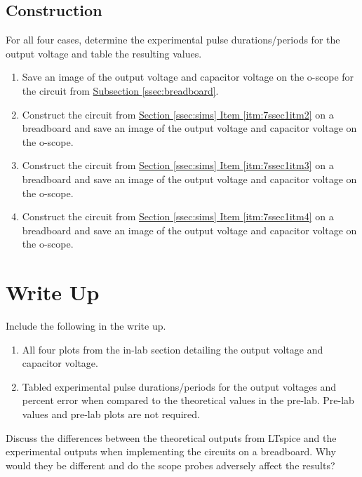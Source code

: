\subsection{Construction}

For all four cases, determine the experimental pulse durations/periods for the output voltage and table the resulting values. 

\begin{enumerate}
	\item Save an image of the output voltage and capacitor voltage on the o-scope for the circuit from \hyperref[ssec:breadboard]{Subsection \ref*{ssec:breadboard}}.
	\item Construct the circuit from \hyperref[itm:7ssec1itm2]{Section \ref*{ssec:sims} Item \ref*{itm:7ssec1itm2}} on a breadboard and save an image of the output voltage and capacitor voltage on the o-scope.
	\item Construct the circuit from \hyperref[itm:7ssec1itm3]{Section \ref*{ssec:sims} Item \ref*{itm:7ssec1itm3}} on a breadboard and save an image of the output voltage and capacitor voltage on the o-scope.
	\item Construct the circuit from \hyperref[itm:7ssec1itm4]{Section \ref*{ssec:sims} Item \ref*{itm:7ssec1itm4}} on a breadboard and save an image of the output voltage and capacitor voltage on the o-scope.
\end{enumerate}

\section{Write Up}

Include the following in the write up.

\begin{enumerate}
	\item All four plots from the in-lab section detailing the output voltage and capacitor voltage. 
	\item Tabled experimental pulse durations/periods for the output voltages and percent error when compared to the theoretical values in the pre-lab. Pre-lab values and pre-lab plots are not required. 
\end{enumerate}

Discuss the differences between the theoretical outputs from LTspice and the experimental outputs when implementing the circuits on a breadboard. Why would they be different and do the scope probes adversely affect the results? 


